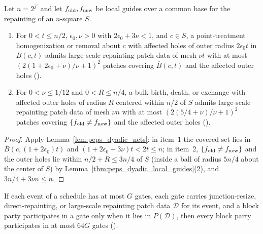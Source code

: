 \begin{lemma}
    \label{thm:peps_dyadic_large_repainting_nets}
    \leanok
    Let $n=2^{j'}$ and let $f_{\rm old},f_{\rm new}$ be local guides over a common
    base for the repainting of an $n$-square $S$.
    \begin{enumerate}
        \item For $0<t\le n/2$, $\epsilon_0,\nu>0$ with $2\epsilon_0+3\nu<1$, and
              $c\in S$, a point-treatment homogenization or removal about $c$ with
              affected holes of outer radius $2\epsilon_0t$ in $\overline B(c,t)$
              admits large-scale repainting patch data of mesh $\nu t$ with at most
              $(2(1+2\epsilon_0+\nu)/\nu+1)^2$ patches covering $\overline B(c,t)$
              and the affected outer holes
              (\cite[Section~7, lines 482--505]{OpenAI2026PolynomialPEPS}).
        \item For $0<\nu\le1/12$ and $0<R\le n/4$, a bulk birth, death, or exchange
              with affected outer holes of radius $R$ centered within $n/2$ of $S$
              admits large-scale repainting patch data of mesh $\nu n$ with at most
              $(2(5/4+\nu)/\nu+1)^2$ patches covering $\{f_{\rm old}\ne f_{\rm new}\}$
              and the affected outer holes
              (\cite[Section~7, lines 383--387, 421--430]{OpenAI2026PolynomialPEPS}).
    \end{enumerate}
\end{lemma}

\begin{proof}\leanok
    Apply Lemma~\ref{lem:peps_dyadic_nets}: in item~1 the covered set lies in
    $\overline B(c,(1+2\epsilon_0)t)$ and
    $(1+2\epsilon_0+3\nu)t<2t\le n$; in item~2,
    $\{f_{\rm old}\ne f_{\rm new}\}$ and the outer holes lie within
    $n/2+R\le3n/4$ of $S$ (inside a ball of radius $5n/4$ about the center of $S$)
    by Lemma~\ref{thm:peps_dyadic_local_guides}(2), and $3n/4+3\nu n\le n$.
\end{proof}

\begin{lemma}
    \label{thm:peps_dyadic_large_repainting_lifetime}
    \leanok
    If each event of a schedule has at most $G$ gates, each gate carries
    junction-resize, direct-repainting, or large-scale repainting patch data
    $\mathcal D$ for its event, and a block party participates in a gate only when
    it lies in $P(\mathcal D)$, then every block party participates in at most
    $64G$ gates (\cite[Proposition~7.1, item~2]{OpenAI2026PolynomialPEPS}).
\end{lemma}

